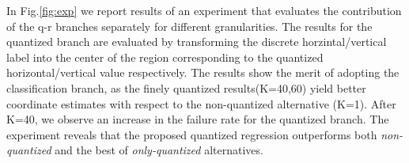 \documentclass[10pt,twocolumn,letterpaper]{article}
\begin{document}
In Fig.\ref{fig:exp} we report results of an experiment that evaluates the contribution of the q-r branches separately for different granularities. The results for the quantized branch are evaluated by transforming the discrete horzintal/vertical label into the center of the region corresponding to the quantized horizontal/vertical value respectively.  The results  show the merit of adopting the classification branch, as the finely quantized results(K=40,60) yield  better coordinate estimates with respect to the non-quantized alternative {(K=1)}. After K=40, we observe an increase in the failure rate for the quantized branch. The experiment reveals that the proposed quantized regression outperforms both \textit{non-quantized} and the best of \textit{only-quantized} alternatives. 
\end{document}
